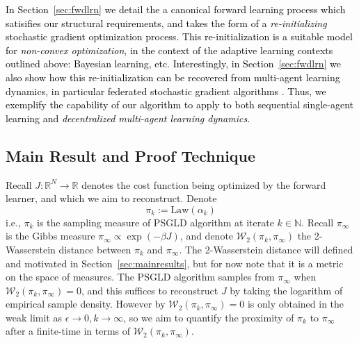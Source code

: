 \documentclass[journal,onecolumn]{IEEEtran}
\newcommand{\alk}{\alpha_k}
\newcommand{\step}{\epsilon}
\newcommand{\rew}{J}
\newcommand{\reals}{\mathbb{R}}
\newcommand{\dimn}{N}
\newcommand{\wass}{\mathcal{W}_2}
\newcommand{\gibbs}{\ids_{\infty}}
\newcommand{\dtlaw}{\ids_{k}} %
\newcommand{\N}{\mathbb{N}}
\newcommand{\ids}{\pi}
\newcommand{\idw}{\gamma}
\newcommand{\ksp}{k,\idw}
\begin{document}
\textcolor{black}{In Section~\ref{sec:fwdlrn} we detail the a canonical forward learning process which satisifies our structural requirements, and takes the form of a \textit{re-initializing} stochastic gradient optimization process. This re-initialization is a suitable model for \textit{non-convex optimization}, in the context of the adaptive learning contexts outlined above: Bayesian learning, etc. Interestingly, in Section~\ref{sec:fwdlrn} we also show how this re-initialization can be recovered from multi-agent learning dynamics, in particular federated stochastic gradient algorithms \cite{yuan2020federated}. Thus, we exemplify the capability of our algorithm to apply to both sequential single-agent learning and \textit{decentralized multi-agent learning dynamics}. }



\subsection{Main Result and Proof Technique}
\label{sec:mainresinf}
 Recall $J: \reals^{\dimn} \to \reals$ denotes the cost function being optimized by the forward learner, and which we aim to reconstruct. Denote 
 \begin{equation}
 \label{eq:dtlaw_def}
     \dtlaw := \textrm{Law}(\alk)
 \end{equation}
 i.e., $\dtlaw$ is the sampling measure of PSGLD algorithm at iterate $k\in\N$. Recall $\gibbs$ is the Gibbs measure $\gibbs \propto \exp(-\beta\rew)$, and denote $\wass(\dtlaw,\gibbs)$ the 2-Wasserstein distance between $\dtlaw$ and $\gibbs$. The 2-Wasserstein distance will defined and motivated in Section~\ref{sec:mainresults}, but for now note that it is a metric on the space of measures. The PSGLD algorithm samples from $\gibbs$ when $\wass(\dtlaw,\gibbs)=0$, and this suffices to reconstruct $\rew$ by taking the logarithm of empirical sample density. However by \cite{krishnamurthy2021langevin} $\wass(\dtlaw,\gibbs)=0$ is only obtained {\color{black}in the weak limit as $\step \to 0, k \to \infty$}, so we aim to quantify the proximity of $\dtlaw$ to $\gibbs$ after a finite-time in terms of $\wass(\dtlaw,\gibbs)$.
 
\end{document}
